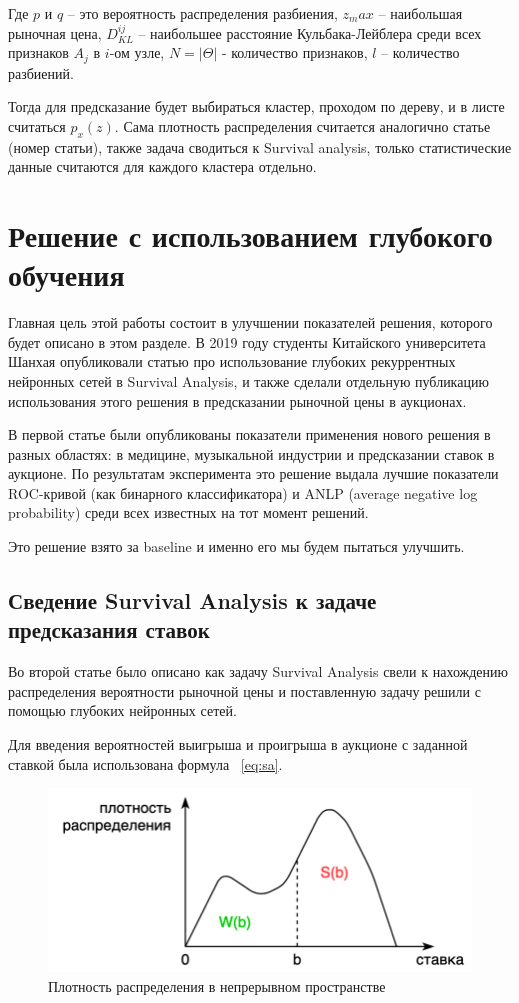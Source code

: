 \documentclass[times,specification,annotation]{itmo-student-thesis}
\begin{document}
Где $p$ и $q$ – это вероятность распределения разбиения, 
$z_max$ – наибольшая рыночная цена, 
$D_{KL}^{ij}$ – наибольшее расстояние Кульбака-Лейблера среди всех признаков $A_j$ в $i$-ом узле,
$N=  |\Theta|$ - количество признаков,
$l$ – количество разбиений.

Тогда для предсказание будет выбираться кластер, проходом по дереву, и в листе считаться $p_x (z)$.
Сама плотность распределения считается аналогично статье (номер статьи), 
также задача сводиться к Survival analysis, только статистические данные считаются для каждого кластера отдельно.

\section{Решение с использованием глубокого обучения}

Главная цель этой работы состоит в улучшении показателей решения, которого будет описано в этом разделе.
В 2019 году студенты Китайского университета Шанхая опубликовали статью про использование глубоких рекуррентных нейронных сетей в Survival Analysis, 
и также сделали отдельную публикацию использования этого решения в предсказании рыночной цены в аукционах.

В первой статье были опубликованы показатели применения нового решения в разных областях: 
в медицине, музыкальной индустрии и предсказании ставок в аукционе. 
По результатам эксперимента это решение выдала лучшие показатели ROC-кривой (как бинарного классификатора) и 
ANLP (average negative log probability) среди всех известных на тот момент решений.

Это решение взято за baseline и именно его мы будем пытаться улучшить.

\subsection{Сведение Survival Analysis к задаче предсказания ставок}

Во второй статье было описано как задачу Survival Analysis свели к нахождению распределения вероятности рыночной цены 
и поставленную задачу решили с помощью глубоких нейронных сетей.

Для введения вероятностей выигрыша и проигрыша в аукционе 
с заданной ставкой была использована формула ~\ref{eq:sa}.

\begin{figure}[h]
    \caption{Плотность распределения в непрерывном пространстве}
    \centering
    \includegraphics{w_s_curve.png}
\end{figure}
\end{document}
